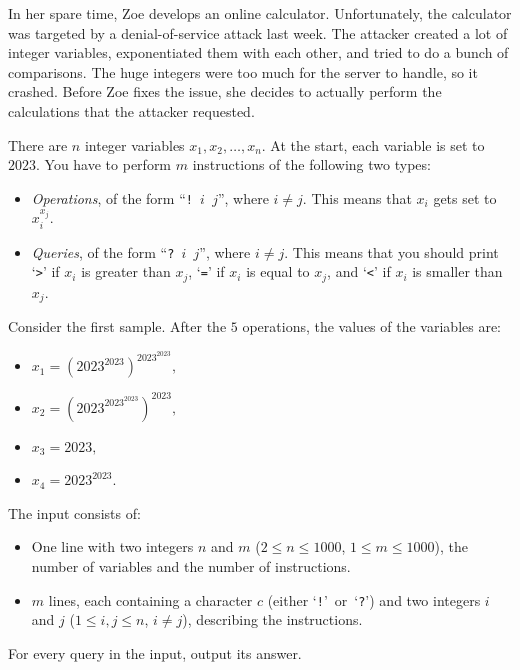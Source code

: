 
%
%
\newcommand{\maxn}{1000}%
\newcommand{\maxm}{1000}%
%
In her spare time, Zoe develops an online calculator.
Unfortunately, the calculator was targeted by a denial-of-service attack last week.
The attacker created a lot of integer variables, exponentiated them with each other,
and tried to do a bunch of comparisons. The huge integers were too much for the server to handle, so it
crashed. Before Zoe fixes the issue, she decides to actually perform the calculations that the attacker
requested.


There are $n$ integer variables $x_1, x_2, \dots, x_n$. At the start, each variable is set to $2023$.
You have to perform $m$ instructions of the following two types:
\begin{itemize}
\item \textit{Operations}, of the form ``\texttt{!~$i$~$j$}'', where $i \neq j$.
    This means that $x_i$ gets set to $x_i^{x_j}$.
\item \textit{Queries}, of the form ``\texttt{?~$i$~$j$}'', where $i \neq j$.
    This means that you should print `\verb|>|' if $x_i$ is greater than $x_j$, `\verb|=|' if $x_i$ is equal to
    $x_j$, and `\verb|<|' if $x_i$ is smaller than $x_j$.
\end{itemize}

Consider the first sample. After the $5$ operations, the values of the variables are:
\newcommand{\x}{{2023}}
\begin{itemize}
    \item $x_1 = \left(\x^\x\right)^{\x^\x},$
    \item $x_2 =\left(\x^{\x^\x}\right)^\x,$
    \item $x_3 =\x,$
    \item $x_4 =\x^\x$.
\end{itemize}

%

\begin{Input}
    The input consists of:
    \begin{itemize}
        \item One line with two integers $n$ and $m$ ($2 \leq n \leq \maxn$, $1 \leq m \leq \maxm$),
            the number of variables and the number of instructions.
        \item $m$ lines, each containing a character $c$ (either `\texttt{!}'~or~`\texttt{?}')
            and two integers $i$ and $j$ ($1 \leq i, j \leq n$, $i \neq j$), describing the instructions.
    \end{itemize}
\end{Input}

\begin{Output}
    For every query in the input, output its answer.
\end{Output}
